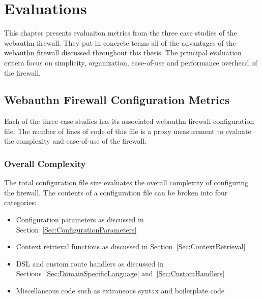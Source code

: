 
\chapter{Evaluations}

This chapter presents evaluaiton metrics from the three case studies of the webauthn firewall. They put in concrete terms all of the advantages of the webauthn firewall discussed throughout this thesis. The principal evaluation critera focus on simplicity, organization, ease-of-use and performance overhead of the firewall.

\section{Webauthn Firewall Configuration Metrics}

Each of the three case studies has its associated webauthn firewall configuration file. The number of lines of code of this file is a proxy measurement to evaluate the complexity and ease-of-use of the firewall. 

\subsection{Overall Complexity}

The total configuration file size evaluates the overall complexity of configuring the firewall. The contents of a configuration file can be broken into four categories:

\begin{itemize}[nosep]

\item Configuration parameters as discussed in Section~\ref{Sec:ConfigurationParameters}

\item Context retrieval functions as discussed in Section~\ref{Sec:ContextRetrieval}

\item DSL and custom route handlers as discussed in Sections~\ref{Sec:DomainSpecificLanguage} and~\ref{Sec:CustomHandlers}

\item Miscellaneous code such as extraneous syntax and boilerplate code

\end{itemize}

